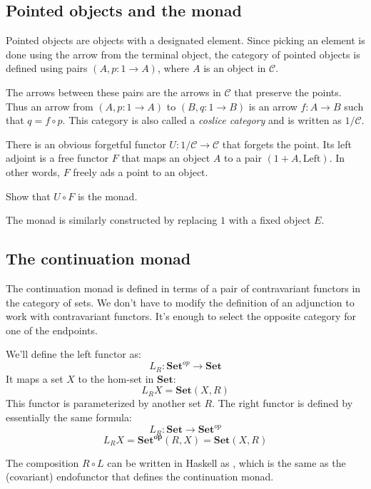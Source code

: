 \documentclass[DaoFP]{subfiles}
\begin{document}
\subsection{Pointed objects and the  monad}

Pointed objects are objects with a designated element. Since picking an element is done using the arrow from the terminal object, the category of pointed objects is defined using pairs $(A, p \colon 1 \to A)$, where $A$ is an object in $\mathcal{C}$. 

The arrows between these pairs are the arrows in $\mathcal{C}$ that preserve the points. Thus an arrow from $(A, p \colon 1 \to A)$ to $(B, q \colon 1 \to B)$ is an arrow $f \colon A \to B$ such that $q = f \circ p$. This category is also called a \emph{coslice category} and is written as $1/\mathcal{C}$.

There is an obvious forgetful functor $U \colon 1/\mathcal{C} \to \mathcal{C}$ that forgets the point. Its left adjoint is a free functor $F$ that maps an object $A$ to a pair $(1 + A, \text{Left})$. In other words, $F$ freely ads a point to an object. 

\begin{exercise}
Show that $U \circ F$ is the  monad.
\end{exercise}

The  monad is similarly constructed by replacing $1$ with a fixed object $E$.

\subsection{The continuation monad}

The continuation monad is defined in terms of a pair of contravariant functors in the category of sets. We don't have to modify the definition of an adjunction to work with contravariant functors. It's enough to select the opposite category for one of the endpoints. 

We'll define the left functor as:
\[ L_R \colon \mathbf{Set}^{op} \to \mathbf{Set} \] 
It maps a set $X$ to the hom-set in $\mathbf{Set}$:
\[ L_R X = \mathbf{Set}(X, R) \] 
This functor is parameterized by another set $R$. The right functor is defined by essentially the same formula:
\[ L_R \colon \mathbf{Set} \to \mathbf{Set}^{op} \] 
\[ L_R X = \mathbf{Set^{op}}(R, X)  = \mathbf{Set}(X, R) \] 


The composition $R \circ L$ can be written in Haskell as , which is the same as the (covariant) endofunctor that defines the continuation monad.
\end{document}
